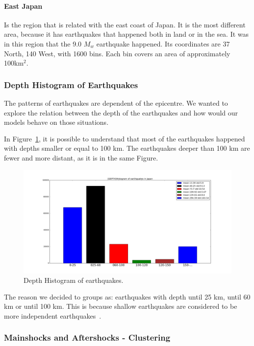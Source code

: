 \paragraph{East Japan} Is the region that is related with the east coast of Japan. It is the most different area, because it has earthquakes that happened both in land or in the sea. It was in this region that the 9.0 $M_w$ earthquake happened. Its coordinates are 37 North, 140 West, with 1600 bins. Each bin covers an area of approximately 100km$^2$. 

\subsubsection{Depth Histogram of Earthquakes}


The patterns of earthquakes are dependent of the epicentre. We wanted to explore the relation between the depth of the earthquakes and how would our models behave on those situations.

In Figure~\ref{histogramQuakes}, it is possible to understand that most of the earthquakes happened with depths smaller or equal to 100 km. The earthquakes deeper than 100 km are fewer and more distant, as it is in the same Figure.\\

\begin{figure}[]
	\centering
	\includegraphics[scale=0.15, left]{img/detphsNew.png}
	\caption{Depth Histogram of earthquakes.}
	\label{histogramQuakes}
\end{figure}

The reason we decided to groups as: earthquakes with depth until 25 km, until 60 km or until 100 km. This is because shallow earthquakes are considered to be more independent earthquakes~\cite{yamanaka1990scaling}.

\subsubsection{Mainshocks and Aftershocks - Clustering}\label{Clustering}

